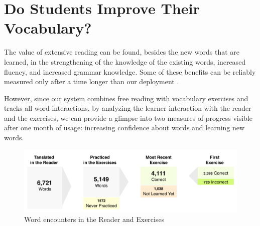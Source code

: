 
\newpage
\section{Do Students Improve Their Vocabulary?}

  The value of extensive reading can be found, besides the new words that are learned, in the strengthening of the knowledge of the existing words, increased fluency, and increased grammar knowledge. Some of these benefits can be reliably measured only after a time longer than our deployment \cite{renadya07-power}. 

  However, since our system combines free reading with vocabulary exercises and tracks all word interactions, by analyzing the learner interaction with the reader and the exercises, we can provide a glimpse into two measures of progress visible after one month of usage: increasing confidence about words and learning new words. 

   \begin{figure}[h!]
  \centering
    \includegraphics[width=0.87\columnwidth]{figures/word-learning-flow.pdf}
    \caption{Word encounters in the Reader and Exercises}
    \label{fig:word_learning_flow}
  \end{figure}


